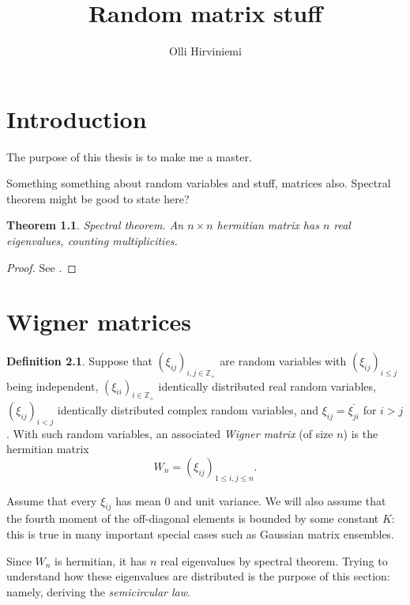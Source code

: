 \documentclass[12pt,a4paper,leqno]{report}
\title{Random matrix stuff}
\author{Olli Hirviniemi}
\date{}
\newcommand{\Z}{\mathbb{Z}}
\theoremstyle{plain}
\newtheorem{theo}[equation]{Theorem}
\theoremstyle{definition}
\newtheorem{defi}[equation]{Definition}
\theoremstyle{remark}
\begin{document}
\maketitle

\tableofcontents

\chapter{Introduction}
\label{intro}

The purpose of this thesis is to make me a master.


Something something about random variables and stuff, matrices also. Spectral theorem might be good to state here?

\begin{theo}\label{specth}
\emph{Spectral theorem.} An $n \times n$ hermitian matrix has $n$ real eigenvalues, counting multiplicities.
\end{theo}

\begin{proof}
See \cite{Tao}.
\end{proof}

\chapter{Wigner matrices}
\label{setup}

\begin{defi}
Suppose that $(\xi_{ij})_{i,j \in \Z_+}$ are random variables with $(\xi_{ij})_{i \leq j}$ being independent, $(\xi_{ii})_{i \in \Z_+}$ identically distributed real random variables, $(\xi_{ij})_{i<j}$ identically distributed complex random variables, and $\xi_{ij}=\overline{\xi_{ji}}$ for $i>j$. With such random variables, an associated \emph{Wigner matrix} (of size $n$) is the hermitian matrix
\begin{equation*}
W_n = (\xi_{ij})_{1\leq i,j \leq n}.
\end{equation*} 
\end{defi}

Assume that every $\xi_{ij}$ has mean $0$ and unit variance. We will also assume that the fourth moment of the off-diagonal elements is bounded by some constant $K$: this is true in many important special cases such as Gaussian matrix ensembles.

Since $W_n$ is hermitian, it has $n$ real eigenvalues by spectral theorem.
Trying to understand how these eigenvalues are distributed is the purpose of this section: namely, deriving the \emph{semicircular law}.
\end{document}
